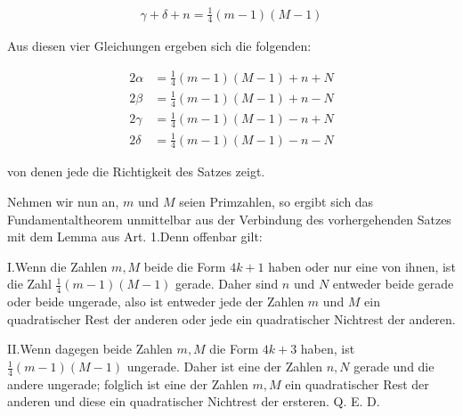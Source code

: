 \[
\begin{aligned}
\gamma+\delta+n=\tfrac14(m-1)(M-1)
\end{aligned}
\]

Aus diesen vier Gleichungen ergeben sich die folgenden:

\[
\begin{aligned}
2\alpha&=\tfrac14(m-1)(M-1)+n+N\\
2\beta&=\tfrac14(m-1)(M-1)+n-N\\
2\gamma&=\tfrac14(m-1)(M-1)-n+N\\
2\delta&=\tfrac14(m-1)(M-1)-n-N
\end{aligned}
\]

von denen jede die Richtigkeit des Satzes zeigt.


Nehmen wir nun an, $m$ und $M$ seien Primzahlen, so ergibt sich das Fundamentaltheorem unmittelbar aus der Verbindung des vorhergehenden Satzes mit dem Lemma aus Art. 1.\quad Denn offenbar gilt:

I.\quad Wenn die Zahlen $m,M$ beide die Form $4k+1$ haben oder nur eine von ihnen, ist die Zahl $\frac14(m-1)(M-1)$ gerade. Daher sind $n$ und $N$ entweder beide gerade oder beide ungerade, also ist entweder jede der Zahlen $m$ und $M$ ein quadratischer Rest der anderen oder jede ein quadratischer Nichtrest der anderen.

II.\quad Wenn dagegen beide Zahlen $m,M$ die Form $4k+3$ haben, ist \mbox{$\frac14(m-1)(M-1)$} ungerade. Daher ist eine der Zahlen $n,N$ gerade und die andere ungerade; folglich ist eine der Zahlen $m,M$ ein quadratischer Rest der anderen und diese ein quadratischer Nichtrest der ersteren. Q. E. D.
